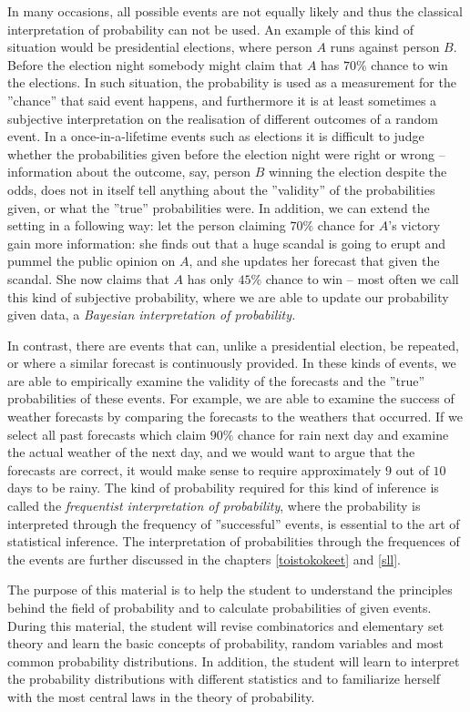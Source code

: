 \documentclass[12pt,a4paper,leqno]{report}
\theoremstyle{plain}
\theoremstyle{definition}
\begin{document}
In many occasions, all possible events are not equally likely and thus the classical interpretation of probability can not be used. An example of this kind of situation would be presidential elections, where person $A$ runs against person $B$. Before the election night somebody might claim that $A$ has $70\%$ chance to win the elections. In such situation, the probability is used as a measurement for the ''chance'' that said event happens, and furthermore it is at least sometimes a subjective interpretation on the realisation of different outcomes of a random event. In a once-in-a-lifetime events such as elections it is difficult to judge whether the probabilities given before the election night were right or wrong -- information about the outcome, say, person $B$ winning the election despite the odds, does not in itself tell anything about the ''validity'' of the probabilities given, or what the ''true'' probabilities were. In addition, we can extend the setting in a following way: let the person claiming $70\%$ chance for $A$'s victory gain more information: she finds out that a huge scandal is going to erupt and pummel the public opinion on $A$, and she updates her forecast that given the scandal. She now claims that $A$ has only $45\%$ chance to win -- most often we call this kind of subjective probability, where we are able to update our probability given data, a \emph{Bayesian interpretation of probability.}

In contrast, there are events that can, unlike a presidential election, be repeated, or where a similar forecast is continuously provided. In these kinds of events, we are able to empirically examine the validity of the forecasts and the ''true'' probabilities of these events. For example, we are able to examine the success of weather forecasts by comparing the forecasts to the weathers that occurred. If we select all past forecasts which claim $90\%$ chance for rain next day and examine the actual weather of the next day, and we would want to argue that the forecasts are correct, it would make sense to require approximately $9$ out of $10$ days to be rainy. The kind of probability required for this kind of inference is called the \emph{frequentist interpretation of probability}, where the probability is interpreted through the frequency of ''successful'' events, is essential to the art of statistical inference. The interpretation of probabilities through the frequences of the events are further discussed in the chapters \ref{toistokokeet} and \ref{sll}. 

The purpose of this material is to help the student to understand the principles behind the field of probability and to calculate probabilities of given events. During this material, the student will revise combinatorics and elementary set theory and learn the basic concepts of probability, random variables and most common probability distributions. In addition, the student will learn to interpret the probability distributions with different statistics and to familiarize herself with the most central laws in the theory of probability.
\end{document}
